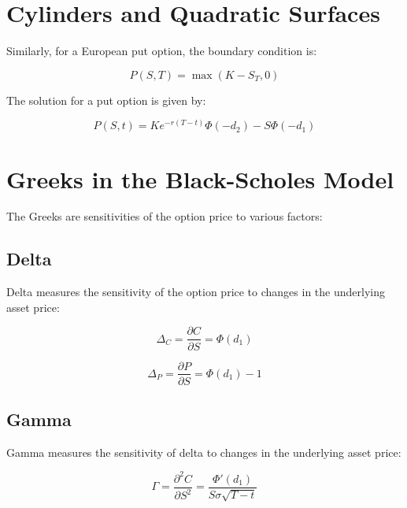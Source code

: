 \documentclass[../main.tex]{subfiles}
\begin{document}



\section{Cylinders and Quadratic Surfaces}

Similarly, for a European put option, the boundary condition is:

\begin{equation}
    P(S, T) = \max(K - S_T, 0)
\end{equation}

The solution for a put option is given by:

\begin{equation}
    P(S, t) = K e^{-r(T-t)} \Phi(-d_2) - S \Phi(-d_1)
\end{equation}

\section{Greeks in the Black-Scholes Model}

The Greeks are sensitivities of the option price to various factors:

\subsection{Delta}

Delta measures the sensitivity of the option price to changes in the underlying asset price:

\begin{equation}
    \Delta_C = \frac{\partial C}{\partial S} = \Phi(d_1)
\end{equation}

\begin{equation}
    \Delta_P = \frac{\partial P}{\partial S} = \Phi(d_1) - 1
\end{equation}

\subsection{Gamma}

Gamma measures the sensitivity of delta to changes in the underlying asset price:

\begin{equation}
    \Gamma = \frac{\partial^2 C}{\partial S^2} = \frac{\Phi'(d_1)}{S \sigma \sqrt{T - t}}
\end{equation}
\end{document}
